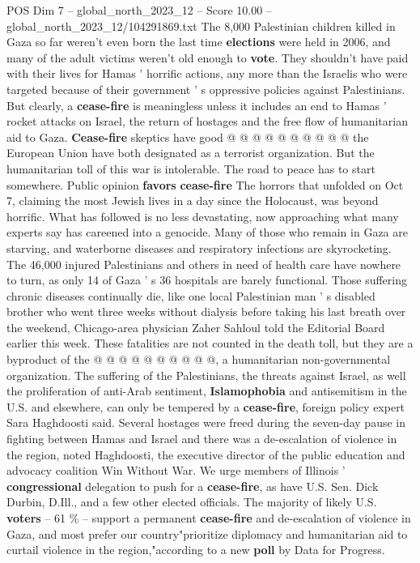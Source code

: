 \begin{textsample}{POS Dim 7 – global\_north\_2023\_12 – Score 10.00 – global\_north\_2023\_12/104291869.txt}
The 8,000 Palestinian children killed in Gaza so far weren't even born the last time \textbf{elections} were held in 2006, and many of the adult victims weren't old enough to \textbf{vote}.
They shouldn't have paid with their lives for Hamas ' horrific actions, any more than the Israelis who were targeted because of their government ' s oppressive policies against Palestinians.
But clearly, a \textbf{cease-fire} is meaningless unless it includes an end to Hamas ' rocket attacks on Israel, the return of hostages and the free flow of humanitarian aid to Gaza. \textbf{Cease-fire} skeptics have good @ @ @ @ @ @ @ @ @ @ the European Union have both designated as a terrorist organization.
But the humanitarian toll of this war is intolerable.
The road to peace has to start somewhere.
Public opinion \textbf{favors} \textbf{cease-fire} The horrors that unfolded on Oct 7, claiming the most Jewish lives in a day since the Holocaust, was beyond horrific.
What has followed is no less devastating, now approaching what many experts say has careened into a genocide.
Many of those who remain in Gaza are starving, and waterborne diseases and respiratory infections are skyrocketing.
The 46,000 injured Palestinians and others in need of health care have nowhere to turn, as only 14 of Gaza ' s 36 hospitals are barely functional.
Those suffering chronic diseases continually die, like one local Palestinian man ' s disabled brother who went three weeks without dialysis before taking his last breath over the weekend, Chicago-area physician Zaher Sahloul told the Editorial Board earlier this week.
These fatalities are not counted in the death toll, but they are a byproduct of the @ @ @ @ @ @ @ @ @ @, a humanitarian non-governmental organization.
The suffering of the Palestinians, the threats against Israel, as well the proliferation of anti-Arab sentiment, \textbf{Islamophobia} and antisemitism in the U.S. and elsewhere, can only be tempered by a \textbf{cease-fire}, foreign policy expert Sara Haghdoosti said.
Several hostages were freed during the seven-day pause in fighting between Hamas and Israel and there was a de-escalation of violence in the region, noted Haghdoosti, the executive director of the public education and advocacy coalition Win Without War.
We urge members of Illinois ' \textbf{congressional} delegation to push for a \textbf{cease-fire}, as have U.S.
Sen.
Dick Durbin, D.Ill., and a few other elected officials.
The majority of likely U.S. \textbf{voters} -- 61 \% -- support a permanent \textbf{cease-fire} and de-escalation of violence in Gaza, and most prefer our country"prioritize diplomacy and humanitarian aid to curtail violence in the region,"according to a new \textbf{poll} by Data for Progress.

\end{textsample}
